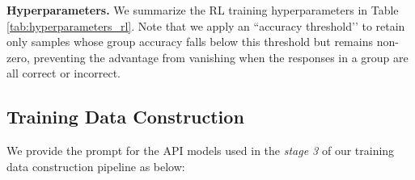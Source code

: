 \textbf{Hyperparameters.}  We summarize the RL training hyperparameters in Table \ref{tab:hyperparameters_rl}. Note that we apply an “accuracy threshold’’ to retain only samples whose group accuracy falls below this threshold but remains non-zero, preventing the advantage from vanishing when the responses in a group are all correct or incorrect.
\begin{table}[htbp]
    \centering
    \caption{\textbf{Hyperparameters for RL.} }
    \label{tab:hyperparameters_rl}
\end{table}


\subsection{Training Data Construction}
\label{app:data_construction}
We provide the prompt for the API models used in the \textit{stage 3} of our training data construction pipeline as below:

